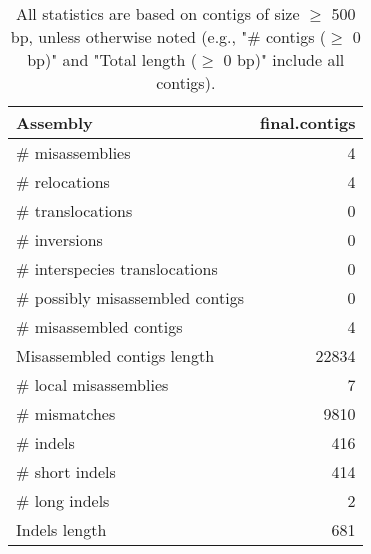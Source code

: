 \documentclass[12pt,a4paper]{article}
\begin{document}
\begin{table}[ht]
\begin{center}
\caption{All statistics are based on contigs of size $\geq$ 500 bp, unless otherwise noted (e.g., "\# contigs ($\geq$ 0 bp)" and "Total length ($\geq$ 0 bp)" include all contigs).}
\begin{tabular}{|l*{1}{|r}|}
\hline
Assembly & final.contigs \\ \hline
\# misassemblies & 4 \\ \hline
\hspace{5mm}\# relocations & 4 \\ \hline
\hspace{5mm}\# translocations & 0 \\ \hline
\hspace{5mm}\# inversions & 0 \\ \hline
\hspace{5mm}\# interspecies translocations & 0 \\ \hline
\# possibly misassembled contigs & 0 \\ \hline
\# misassembled contigs & 4 \\ \hline
Misassembled contigs length & 22834 \\ \hline
\# local misassemblies & 7 \\ \hline
\# mismatches & 9810 \\ \hline
\# indels & 416 \\ \hline
\hspace{5mm}\# short indels & 414 \\ \hline
\hspace{5mm}\# long indels & 2 \\ \hline
Indels length & 681 \\ \hline
\end{tabular}
\end{center}
\end{table}
\end{document}
